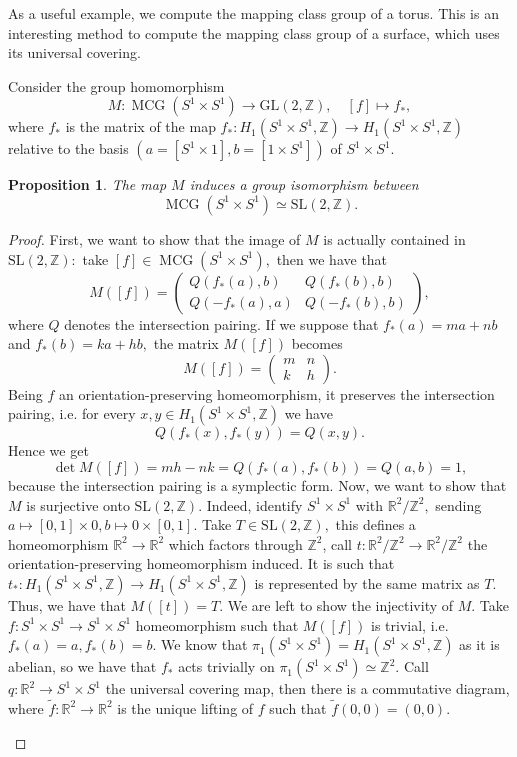 \documentclass[a4paper,12 pt,titlepage,twoside]{book}
\newcommand{\numberset}{\mathbb}
\newcommand{\Z}{\numberset{Z}}
\newcommand{\R}{\numberset{R}}
\DeclareMathOperator{\mcg}{MCG}
\theoremstyle{plain}
\theoremstyle{theorem}
\newtheorem{prop}[thm]{Proposition}
\theoremstyle{definition}
\theoremstyle{remark}
\begin{document}
As a useful example, we compute the mapping class group of a torus. This is an interesting method to compute the mapping class group of a surface, which uses its universal covering.

Consider the group homomorphism $$M \colon \mcg(S^1\times S^1) \rightarrow \text{GL}(2,\Z), \quad [f] \mapsto f_*,$$ where $f_*$ is the matrix of the map $f_* \colon H_1(S^1\times S^1,\Z) \rightarrow H_1(S^1\times S^1,\Z)$ relative to the basis $(a =[S^1 \times 1],b= [1 \times S^1])$ of $S^1\times S^1$.
\begin{prop}
	The map $M$ induces a group isomorphism between $$\mcg(S^1 \times S^1) \simeq \text{SL}(2,\Z).$$
\end{prop}
\begin{proof}
	First, we want to show that the image of $M$ is actually contained in $\text{SL}(2,\Z):$ take $[f] \in \mcg(S^1\times S^1),$ then we have that $$M([f]) = \left(\begin{array}{cc} Q(f_*(a),b) & Q(f_*(b),b)\\ Q(-f_*(a),a) & Q(-f_*(b),b)
	\end{array}\right),$$ where $Q$ denotes the intersection pairing. If we suppose that $f_*(a)=ma+nb$ and $ f_*(b)=ka+hb,$ the matrix $M([f])$ becomes $$M([f]) = \left(\begin{array}{cc} m & n \\ k & h \end{array}\right).$$ Being $f$ an orientation-preserving homeomorphism, it preserves the intersection pairing, i.e. for every $x,y \in H_1(S^1\times S^1,\Z)$ we have $$Q(f_*(x), f_*(y)) = Q(x,y).$$ Hence we get $$\det M([f]) = mh-nk = Q(f_*(a),f_*(b)) = Q(a,b) = 1,$$ because the intersection pairing is a symplectic form. Now, we want to show that $M$ is surjective onto $\text{SL}(2,\Z).$ Indeed, identify $S^1\times S^1$ with $\R^2/\Z^2,$ sending $a \mapsto [0,1]\times 0, b \mapsto 0 \times [0,1].$ Take $T \in \text{SL}(2,\Z), $ this defines a homeomorphism $\R^2 \rightarrow \R^2$ which factors through $\Z^2$, call $t \colon \R^2/\Z^2 \rightarrow \R^2/\Z^2$ the orientation-preserving homeomorphism induced. It is such that $t_* \colon H_1(S^1 \times S^1,\Z) \rightarrow H_1(S^1\times S^1,\Z)$ is represented by the same matrix as $T$. Thus, we have that $M([t]) = T.$ We are left to show the injectivity of $M$. Take $f \colon S^1 \times S^1 \rightarrow S^1\times S^1$ homeomorphism such that $M([f])$ is trivial, i.e. $f_*(a)=a, f_*(b)=b.$ We know that $\pi_1(S^1 \times S^1) = H_1(S^1 \times S^1,\Z)$ as it is abelian, so we have that $f_*$ acts trivially on $\pi_1(S^1 \times S^1)\simeq \Z^2.$ Call $q \colon \R^2 \rightarrow S^1 \times S^1$ the universal covering map, then there is a commutative diagram, where $\tilde{f} \colon \R^2 \rightarrow \R^2$ is the unique lifting of $f$ such that $\tilde{f}(0,0)=(0,0).$ \begin{center}

\end{center}
\end{proof}
\end{document}

